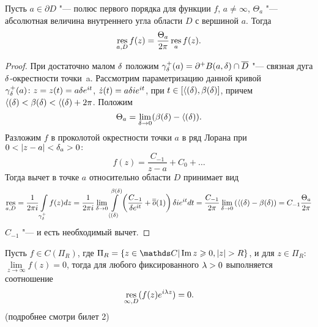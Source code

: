 \begin{Pre}
Пусть $a \in \partial D$ "--- полюс первого порядка для функции $f$, $a \not= \infty$, $\Theta_a$ "--- абсолютная величина внутреннего угла области $D$ с вершиной $a$. Тогда
\[
\mathop{\rm res}\limits\limits_{a, D}f(z) = \frac{\Theta_a}{2\pi}\mathop{\rm res}\limits\limits_{a}f(z).
\]
\end{Pre}
\begin{proof} При достаточно малом $\delta$ положим $\gamma_{\delta}^{+}(a) =\partial^{+}B(a,\delta) \cap \overline{D}$ "--- связная дуга $\delta$-окрестности точки~a. Рассмотрим параметризацию данной кривой $\gamma_{\delta}^{+}(a) \colon z = z(t) = a\delta e^{it}$, $\dot z(t) = a\delta i  e^{it}$,  при $t \in [\langle(\delta),\beta(\delta)]$, причем~$\langle(\delta)<\beta(\delta)<\langle(\delta)+2\pi$.
Положим
\[
\Theta_a = \lim\limits_{\delta \rightarrow 0} (\beta(\delta) - \langle(\delta) ).
\]
Разложим $f$ в проколотой окрестности точки $a$ в ряд Лорана при $0 < |z-a| <\delta_a >0 \colon$
\[
f(z) = \frac{C_{-1}}{z-a} + C_0 + \dots
\]
Тогда вычет в точке $a$ относительно области $D$ принимает вид
 \[
 \mathop{\rm res}\limits\limits_{a,D} = \frac{1}{2 \pi i} \int\limits_{\gamma_{\delta}^{+}} f(z)dz = \frac{1}{2\pi i} \lim\limits_{\delta \rightarrow 0} \int\limits_{\langle(\delta)}^{\beta(\delta)} \left(\frac{C_{-1}}{\delta e^{it}} + \overline{\overline{o}}(1)\right)\delta ie^{it}dt = \frac{C_{-1}}{2\pi}\lim\limits_{\delta \rightarrow 0} \left(\langle(\delta) - \beta(\delta)\right) = C_{-1}\frac{\Theta_a}{2\pi}
 \]
 $C_{-1}$ "--- и есть необходимый вычет.

\end{proof}

\begin{Pre} 
Пусть $f \in C(\Pi_R)$, где $\Pi_R = \{z \in \C |\Im{z} \ge 0,  |z| > R\}$, и для $z \in \Pi_R\colon$ $\lim\limits_{z \to \infty} f(z) = 0$, тогда для любого фиксированного $\lambda > 0$ выполняется соотношение 
\[
\mathop{\rm res}\limits\limits_{\infty, D}(f(z)e^{i \lambda z}) = 0.
\] (подробнее смотри билет 2)
\end{Pre}
